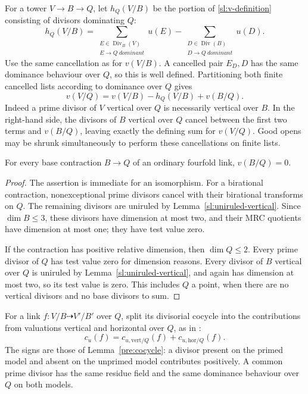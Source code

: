 For a tower $V\to B\to Q$, let $h_Q(V/B)$ be the portion of
\eqref{sl:v-definition} consisting of divisors dominating $Q$:
\begin{equation}
\label{sl:h-definition}
 h_Q(V/B)=
 \sum_{\substack{E\in\operatorname{Div}_{B}(V)\\E\to Q\ {
 dominant}}}u(E)
 -\sum_{\substack{D\in\operatorname{Div}(B)\\D\to Q\ {
 dominant}}}u(D).
\end{equation}
Use the same cancellation as for $v(V/B)$.  A cancelled pair $E_D,D$
has the same dominance behaviour over $Q$, so this is well defined.
Partitioning both finite cancelled lists according to dominance over
$Q$ gives
\begin{equation}
\label{sl:tower}
 v(V/Q)=v(V/B)-h_Q(V/B)+v(B/Q).
\end{equation}
Indeed a prime divisor of $V$ vertical over $Q$ is necessarily
vertical over $B$.  In the right-hand side, the divisors of $B$
vertical over $Q$ cancel between the first two terms and $v(B/Q)$,
leaving exactly the defining sum for $v(V/Q)$.  Good opens may be
shrunk simultaneously to perform these cancellations on finite lists.

\begin{lemma}
\label{sl:base-v-zero}
For every base contraction $B\to Q$ of an ordinary fourfold link,
$v(B/Q)=0$.
\end{lemma}

\begin{proof}
The assertion is immediate for an isomorphism.  For a birational
contraction, nonexceptional prime divisors cancel with their
birational transforms on $Q$.  The remaining divisors are uniruled by
Lemma~\ref{sl:uniruled-vertical}.  Since $\dim B\le3$, these divisors
have dimension at most two, and their MRC quotients have dimension at
most one; they have test value zero.

If the contraction has positive relative dimension, then
$\dim Q\le2$.  Every prime divisor of $Q$ has test value zero for
dimension reasons.  Every divisor of $B$ vertical over $Q$ is
uniruled by Lemma~\ref{sl:uniruled-vertical}, and again has dimension
at most two, so its test value is zero.  This includes $Q$ a point,
when there are no vertical divisors and no base divisors to sum.
\end{proof}

For a link $f:V/B\dashrightarrow V'/B'$ over $Q$, split its divisorial
cocycle into the contributions from valuations vertical and horizontal
over $Q$, as in \cite[Definition~2.3]{LinShinder26}:
\[
 c_u(f)=c_{u,\mathrm{vert}/Q}(f)+c_{u,\mathrm{hor}/Q}(f).
\]
The signs are those of Lemma~\ref{pre:cocycle}: a divisor present
on the primed model and absent on the unprimed model contributes
positively.  A common prime divisor has the same residue field and the
same dominance behaviour over $Q$ on both models.

